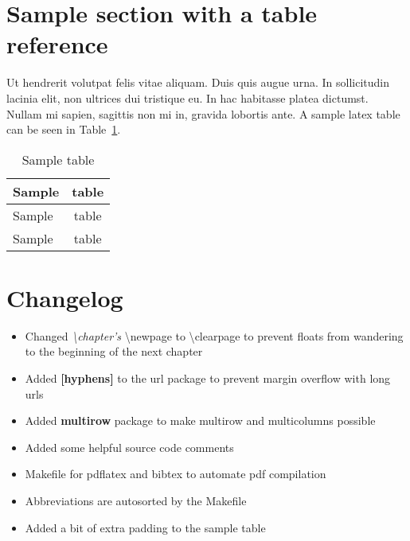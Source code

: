 


\section{Sample section with a table reference}

Ut hendrerit volutpat felis vitae aliquam. Duis quis augue urna. In sollicitudin lacinia elit, 
non ultrices dui tristique eu. In hac habitasse platea dictumst. Nullam mi sapien, sagittis non 
mi in, gravida lobortis ante. A sample latex table can be seen in Table~\ref{tab:sample_table}.


\begin{table}[!ht]
\def\arraystretch{1.1}%
\begin{center}
  \caption{Sample table}
  \label{tab:sample_table}
  \begin{tabular}{| l | c | }
    \hline
    Sample & table \\
    \hline
    Sample & table \\
    Sample & table \\
    \hline
  \end{tabular}

  \end{center}
\end{table}

\section{Changelog}

\begin{itemize}
\item Changed \textit{\textbackslash{chapter's}} \textbackslash{newpage} to 
\textbackslash{clearpage} to prevent floats from wandering to the beginning of the next chapter

\item Added \textbf{[hyphens]} to the url package to prevent margin overflow with 
long urls

\item Added \textbf{multirow} package to make multirow and multicolumns possible

\item Added some helpful source code comments

\item Makefile for pdflatex and bibtex to automate pdf compilation

\item Abbreviations are autosorted by the Makefile

\item Added a bit of extra padding to the sample table
\end{itemize}

